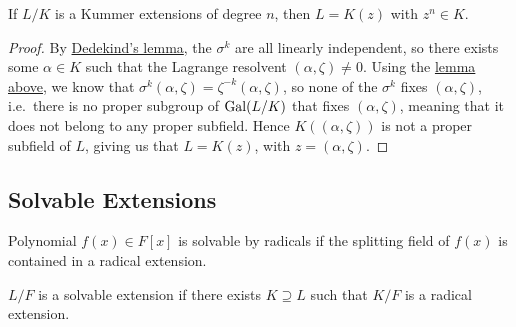 \begin{proposition}\label{prop:kummer-simple-radical}
    If \(L/K\) is a Kummer extensions of degree \(n\),
    then \(L = K(z)\) with \(z^n \in K\).
\end{proposition}
\begin{proof}
    By \hyperref[lem:dedekind]{Dedekind's lemma},
    the \(\sigma^k\) are all linearly independent,
    so there exists some \(\alpha \in K\) such that the Lagrange resolvent \((\alpha,\zeta) \neq 0\).
    Using the \hyperref[lem:lagrange-resolvent-properties]{lemma above},
    we know that \(\sigma^k(\alpha,\zeta) = \zeta^{-k}(\alpha,\zeta)\),
    so none of the \(\sigma^k\) fixes \((\alpha,\zeta)\),
    i.e.\ there is no proper subgroup of \(\operatorname{Gal}(L/K)\) that fixes \((\alpha,\zeta)\),
    meaning that it does not belong to any proper subfield.
    Hence \(K((\alpha,\zeta))\) is not a proper subfield of \(L\),
    giving us that \(L = K(z)\), with \(z = (\alpha,\zeta)\).
\end{proof}

\subsection*{Solvable Extensions}

\begin{definition}
    Polynomial \(f(x) \in F[x]\) is solvable by radicals
    if the splitting field of \(f(x)\) is contained in a radical extension.
\end{definition}
\begin{definition}
    \(L/F\) is a solvable extension if there exists \(K \supseteq L\)
    such that \(K/F\) is a radical extension.
\end{definition}

